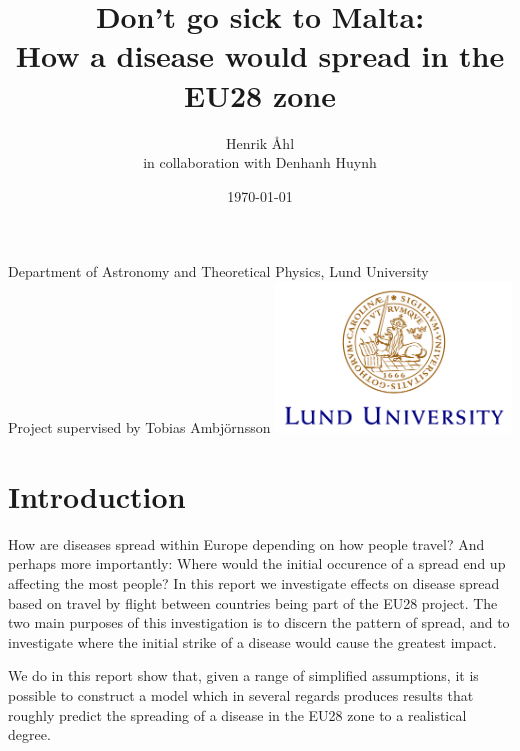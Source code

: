 \documentclass[a4paper,12pt]{article}
\title
{
	\textbf
	{
   Don't go sick to Malta:\\
   How a disease would spread in the EU28 zone
   }
}
\author{Henrik Åhl\\
\small{in collaboration with Denhanh Huynh}}
\date{\today}
\theoremstyle{plain}
\theoremstyle{definition}
\begin{document}
\begin{titlepage}
	
   \maketitle 
	\begin{center}
		\phantom{a}
		{Department of Astronomy and Theoretical Physics, Lund University}
		\\[2cm]
		{Project supervised by Tobias Ambjörnsson}
		\vfill
		\includegraphics[height=4cm]{logocLUeng.pdf}
	\end{center}
	\thispagestyle{empty} %
\end{titlepage}
\section*{Introduction}
   How are diseases spread within Europe depending on how people travel?
   And perhaps more importantly: Where would the initial occurence of a spread end
   up affecting the most people? In this report we investigate effects on
   disease spread based on travel by flight between countries being part of the
   EU28 project. The two main purposes of this investigation is to discern the
   pattern of spread, and to investigate where the initial strike of a disease
   would cause the greatest impact.

   We do in this report show that, given a range of simplified assumptions, it
   is possible to construct a model which in several regards produces results
   that roughly predict the spreading of a disease in the EU28 zone to a
   realistical degree. 

\newpage
\end{document}
